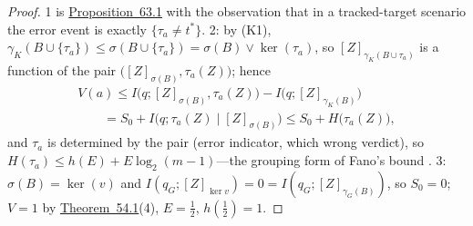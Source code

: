 \begin{proof}

1 is \hyperlink{stmt:63.1}{Proposition~63.1} with the observation that in a tracked-target scenario the error event is exactly \(\{\tau_a \ne t^*\}\). 2: by (K1), \(\gamma_K(B \cup \{\tau_a\}) \le \sigma(B \cup \{\tau_a\}) = \sigma(B) \vee \ker(\tau_a)\), so \([Z]_{\gamma_K(B \cup \tau_a)}\) is a function of the pair \(\big([Z]_{\sigma(B)}, \tau_a(Z)\big)\); hence
\[\begin{gathered}V(a) \le I\big(q; [Z]_{\sigma(B)}, \tau_a(Z)\big) - I\big(q; [Z]_{\gamma_K(B)}\big) \\ {}\qquad = S_0 + I\big(q; \tau_a(Z) \mid [Z]_{\sigma(B)}\big) \le S_0 + H\big(\tau_a(Z)\big),\end{gathered}\]
and \(\tau_a\) is determined by the pair (error indicator, which wrong verdict), so \(H(\tau_a) \le h(E) + E \log_2(m-1)\)---\hspace{0pt}the grouping form of Fano's bound \autocite{cover2006}. 3: \(\sigma(B) = \ker(v)\) and \(I(q_G; [Z]_{\ker v}) = 0 = I(q_G; [Z]_{\gamma_G(B)})\), so \(S_0 = 0\); \(V = 1\) by \hyperlink{stmt:54.1}{Theorem~54.1}(4), \(E = \tfrac12\), \(h(\tfrac12) = 1\).
\end{proof}


